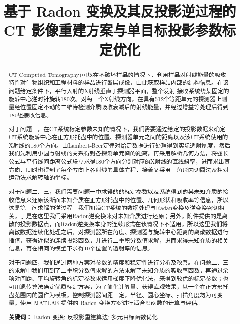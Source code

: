 \documentclass[UTF8]{ctexart}
\title{基于 Radon 变换及其反投影逆过程的 CT 影像重建方案与单目标投影参数标定优化}
\begin{document}
 
\date{}
\maketitle 

\begin{abstract}

CT(Computed Tomography)可以在不破坏样品的情况下，利用样品对射线能量的吸收特性对生物组织和工程材料的样品进行断层成像，由此获取样品内部的结构信息。在该问题给定条件下，平行入射的X射线垂直于探测器平面，整个发射-接收系统绕某固定的旋转中心逆时针旋转180次。对每一个X射线方向，在具有512个等距单元的探测器上测量经位置固定不动的二维待检测介质吸收衰减后的射线能量，并经过增益等处理后得到180组接收信息。

对于问题一，在CT系统标定参数未知的情况下，我们需要通过给定的投影数据来确定CT系统旋转中心在正方形托盘中的位置、探测器单元之间的距离以及该CT系统使用的X射线的180个方向。由Lambert-Beer定律对给定数据进行处理得到实际透射厚度，然后我们先利用小圆与射线的关系得到各探测单元间的距离，再采用解析几何方法，将弦长公式与平行线间距离公式联立求得180个方向分别对应的X射线的直线斜率，进而求出其方向，同时也得到了每个方向上各射线的具体方程，接着又采用三角形内切圆法及相对运动法求解转轴的坐标。

对于问题二、三，我们需要问题一中求得的的标定参数以及系统得到的某未知介质的接收信息来还原该断面未知介质在正方形托盘中的位置、几何形状和吸收率等信息，所以这是第一问求解的逆过程。我们知道CT系统的数据处理与Radan变换及逆变换密切相关，于是在这里我们采用Radon逆变换来对未知介质进行还原；另外，附件提供的是离散的投影数据点，而Radon逆变换本身的连续形式在该情况下不适用，所以这里我们将离散数据连续化处理之后，对探测器所在角度、探测器与旋转中心距离的离散数据进行插值，获得近似的连续投影函数，并进行二重积分数值求解，进而求得未知介质的相关信息，再在相同的模型下求得10个位置的透射率的信息。

对于问题四，我们通过两种方案对参数的精度和稳定性进行分析及改善。在问题二、三的求解中我们用到了二重积分数值求解的方法求解了未知介质的吸收率函数，再通过余项对间距、平均旋转角的标定参数求运用梯度下降优化法，来得到较优的标定参数；也可用遗传算法确定优质标定方案，为了简化计算量、获得直观效果，以一个在正方形托盘范围内的圆作为模板，控制探测器间距一定，半径、圆心坐标、扫描角度均为可变量，使用 MATLAB 提供的 Radon 变换方案进行适合度函数的计算与评估。


\begin{flushleft}
\textbf{关键词：} Radon 变换; 反投影重建算法; 多元目标函数优化
\end{flushleft}
\end{abstract}
\end{document}
